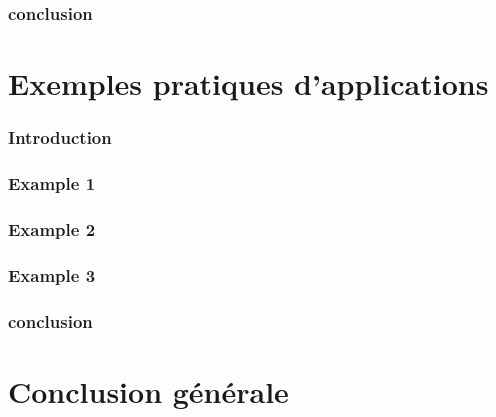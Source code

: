 \documentclass[a4paper,11pt,oneside]{report}
\theoremstyle{plain}
\newcommand{\0}{/ \! \! \! 0}
\theoremstyle{plain}
\begin{document}
\subsection{conclusion}

\chapter{Exemples pratiques d'applications}
\minitoc
\subsection{Introduction}

\subsection{Example 1}

\subsection{Example 2}

\subsection{Example 3}

\subsection{conclusion}

\chapter*{Conclusion g\'en\'erale}
\end{document}
